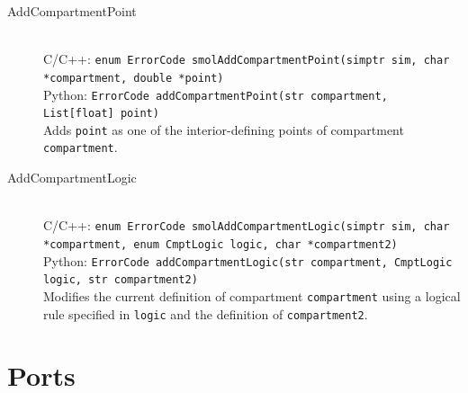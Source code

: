 \documentclass {scrbook}
\newcommand {\ttt} {\texttt}
\begin{document}
\begin{description}
\item[AddCompartmentPoint]
\hfill \\
C/C++: \ttt{enum ErrorCode smolAddCompartmentPoint(simptr sim, char *compartment, double *point)}\\
Python: \ttt{ErrorCode addCompartmentPoint(str compartment, List[float] point)}\\
Adds \ttt{point} as one of the interior-defining points of compartment \ttt{compartment}.

\item[AddCompartmentLogic]
\hfill \\
C/C++: \ttt{enum ErrorCode smolAddCompartmentLogic(simptr sim, char *compartment, enum CmptLogic logic, char *compartment2)}\\
Python: \ttt{ErrorCode addCompartmentLogic(str compartment, CmptLogic logic, str compartment2)}\\
Modifies the current definition of compartment \ttt{compartment} using a logical rule specified in \ttt{logic} and the definition of \ttt{compartment2}.

\end{description}


\section{Ports}
\end{document}
